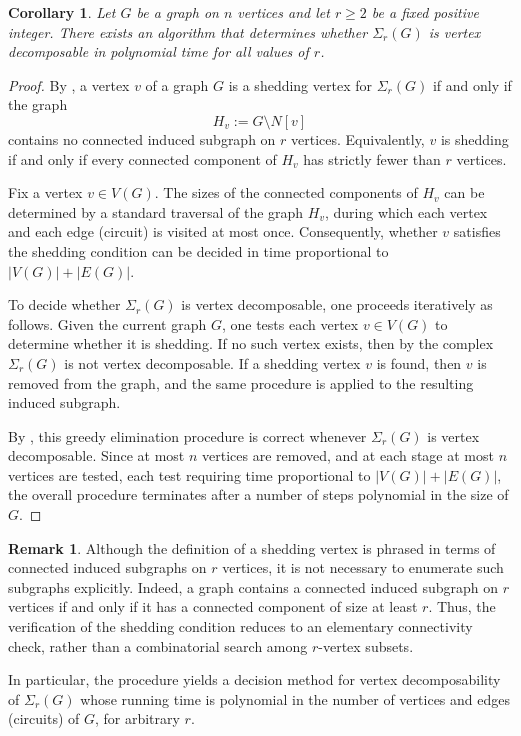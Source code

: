 \documentclass[12pt,reqno]{amsart}
\newtheorem{corollary}[proposition]{Corollary}
\theoremstyle{definition}
\newtheorem{remark}[proposition]{Remark}
\begin{document}
\begin{corollary}\label{algorithm}
    Let $G$ be a graph on $n$ vertices and let $r\geq 2$ be a fixed positive integer. 
    There exists an algorithm that determines whether $\Sigma_r(G)$ is vertex decomposable in polynomial time for all values of $r$. 
\end{corollary}

\begin{proof}
    By , a vertex $v$ of a graph $G$ is a shedding vertex for
$\Sigma_r(G)$ if and only if the graph
\[
H_v := G \setminus N[v]
\]
contains no connected induced subgraph on $r$ vertices.  Equivalently,
$v$ is shedding if and only if every connected component of $H_v$ has
strictly fewer than $r$ vertices.

Fix a vertex $v \in V(G)$.  The sizes of the connected components of
$H_v$ can be determined by a standard traversal of the graph $H_v$,
during which each vertex and each edge (circuit) is visited at most once.
Consequently, whether $v$ satisfies the shedding condition can be
decided in time proportional to $|V(G)|+|E(G)|$.

To decide whether $\Sigma_r(G)$ is vertex decomposable, one proceeds
iteratively as follows.  Given the current graph $G$, one tests each
vertex $v \in V(G)$ to determine whether it is shedding.  If no such
vertex exists, then by  the complex $\Sigma_r(G)$ is not
vertex decomposable.  If a shedding vertex $v$ is found, then $v$ is
removed from the graph, and the same procedure is applied to the
resulting induced subgraph.

By , this greedy elimination procedure is correct whenever
$\Sigma_r(G)$ is vertex decomposable.  Since at most $n$ vertices are
removed, and at each stage at most $n$ vertices are tested, each test
requiring time proportional to $|V(G)|+|E(G)|$, the overall procedure
terminates after a number of steps polynomial in the size of $G$.
\end{proof}

\begin{remark}
Although the definition of a shedding vertex is phrased in terms of connected induced subgraphs on $r$ vertices, it is not necessary to enumerate such subgraphs explicitly.  
Indeed, a graph contains a connected induced subgraph on $r$ vertices if and only if it has a connected component of size at least $r$.  
Thus, the verification of the shedding condition reduces to an elementary connectivity check, rather than a combinatorial search among $r$-vertex subsets.

In particular, the procedure yields a decision method for vertex
decomposability of $\Sigma_r(G)$ whose running time is polynomial in the
number of vertices and edges (circuits) of $G$, for arbitrary $r$.
\end{remark}
\end{document}
